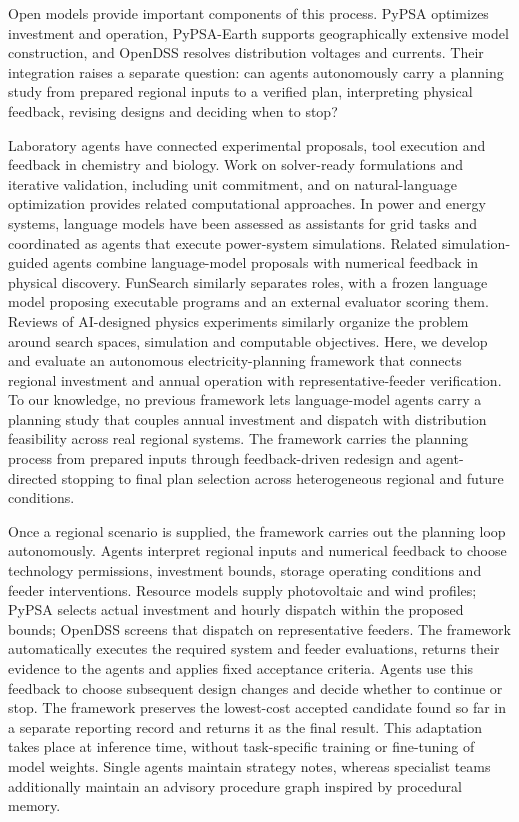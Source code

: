 \documentclass[pdflatex,sn-nature]{sn-jnl}
\begin{document}
Open models provide important components of this process. PyPSA optimizes investment and operation, PyPSA-Earth supports geographically extensive model construction, and OpenDSS resolves distribution voltages and currents\cite{brown2018pypsa,parzen2023pypsaearth,epriopendss}. Their integration raises a separate question: can agents autonomously carry a planning study from prepared regional inputs to a verified plan, interpreting physical feedback, revising designs and deciding when to stop?

Laboratory agents have connected experimental proposals, tool execution and feedback in chemistry and biology\cite{boiko2023autonomous,gottweis2026accelerating,ghareeb2026multi}. Work on solver-ready formulations and iterative validation, including unit commitment, and on natural-language optimization provides related computational approaches\cite{hu2025validation,yuksekgonul2025optimizing}. In power and energy systems, language models have been assessed as assistants for grid tasks\cite{majumder2024llmenergy} and coordinated as agents that execute power-system simulations\cite{jia2025powersim}. Related simulation-guided agents combine language-model proposals with numerical feedback in physical discovery\cite{ma2024simulation}. FunSearch similarly separates roles, with a frozen language model proposing executable programs and an external evaluator scoring them\cite{romeraparedes2024mathematical}. Reviews of AI-designed physics experiments similarly organize the problem around search spaces, simulation and computable objectives\cite{klimesch2026designing}. Here, we develop and evaluate an autonomous electricity-planning framework that connects regional investment and annual operation with representative-feeder verification. To our knowledge, no previous framework lets language-model agents carry a planning study that couples annual investment and dispatch with distribution feasibility across real regional systems. The framework carries the planning process from prepared inputs through feedback-driven redesign and agent-directed stopping to final plan selection across heterogeneous regional and future conditions.

Once a regional scenario is supplied, the framework carries out the planning loop autonomously. Agents interpret regional inputs and numerical feedback to choose technology permissions, investment bounds, storage operating conditions and feeder interventions. Resource models supply photovoltaic and wind profiles; PyPSA selects actual investment and hourly dispatch within the proposed bounds; OpenDSS screens that dispatch on representative feeders. The framework automatically executes the required system and feeder evaluations, returns their evidence to the agents and applies fixed acceptance criteria. Agents use this feedback to choose subsequent design changes and decide whether to continue or stop. The framework preserves the lowest-cost accepted candidate found so far in a separate reporting record and returns it as the final result. This adaptation takes place at inference time, without task-specific training or fine-tuning of model weights. Single agents maintain strategy notes, whereas specialist teams additionally maintain an advisory procedure graph inspired by procedural memory\cite{lu2026procedural}.
\end{document}

